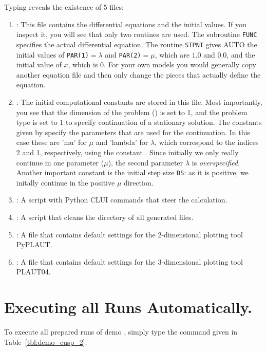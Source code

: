 \documentclass[12pt]{report}
\begin{document}
Typing  reveals the existence of 5 files:
\begin{enumerate}
\item
{}: This file contains the differential equations
and the initial values. If you inspect it, you will see that only two
routines are used. The subroutine {\tt FUNC} specifies the actual
differential equation. The routine {\tt STPNT} gives {\cal AUTO}
the initial values of {\tt PAR(1)}$=\lambda$ and
{\tt PAR(2)}$=\mu$, which
are $1.0$ and $0.0$, and the initial value of $x$, which is $0$.
For your own models you would generally copy another equation file
and then only change the pieces that actually define the equation.

\item
{}: The initial computational constants are stored
in this file. Most importantly, you see that the dimension of the
problem () is set to 1, and the problem type 
is set to 1 to specify continuation of a stationary solution.
The constants given by  specify the parameters that are
used for the continuation. In this case these are 'mu' for $\mu$ and
'lambda' for $\lambda$, which correspond to the indices 2 and 1,
respectively, using the constant .
Since initially we only really continue in one parameter ($\mu$),
the second parameter $\lambda$ is \emph{overspecified}.
Another important constant is the initial step size {\tt DS}: as it is
positive, we initally continue in the positive $\mu$ direction.

\item
{}: A script with Python CLUI commands that steer
the calculation.

\item
{}: A script that cleans the directory of all
generated files.

\item
{}: A file that contains default settings for
the 2-dimensional plotting tool {\cal PyPLAUT}.

\item
{}: A file that contains default settings for
the 3-dimensional plotting tool {\cal PLAUT04}.

\end{enumerate}

\section{ Executing all Runs Automatically.} \label{sec:Tutorial_all_runs}
To execute all prepared runs of demo ,
simply type the command given in Table~\ref{tbl:demo_cusp_2}.
\end{document}
